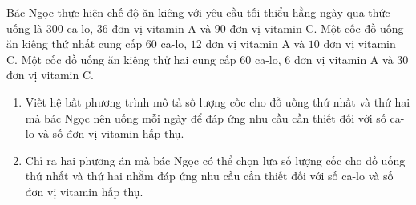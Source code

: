 \begin{bt}%
			Bác Ngọc thực hiện chế độ ăn kiêng với yêu cầu tối thiểu hằng ngày qua thức uống là $300$ ca-lo, $36$ đơn vị vitamin A và $90$ đơn vị vitamin C. Một cốc đồ uống ăn kiêng thứ nhất cung cấp $60$ ca-lo, $12$ đơn vị vitamin A và $10$ đơn vị vitamin C. Một cốc đồ uống ăn kiêng thử hai cung cấp $60$ ca-lo, $6$ đơn vị vitamin A và $30$ đơn vị vitamin C.
			\begin{enumerate}
				\item Viết hệ bất phương trình mô tả số lượng cốc cho đồ uống thứ nhất và thứ hai mà bác Ngọc nên uống mỗi ngày để đáp ứng nhu cầu cần thiết đối với số ca-lo và số đơn vị vitamin hấp thụ.
				\item Chỉ ra hai phương án mà bác Ngọc có thể chọn lựa số lượng cốc cho đồ uống thứ nhất và thứ hai nhằm đáp ứng nhu cầu cần thiết đối với số ca-lo và số đơn vị vitamin hấp thụ.
			\end{enumerate}
\end{bt}
